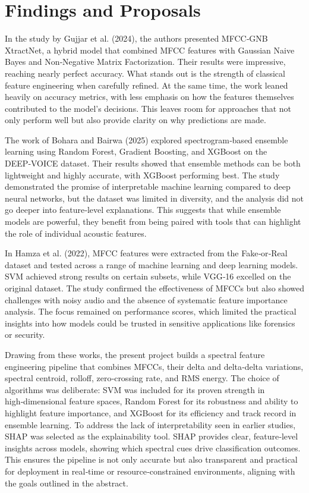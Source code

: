 \documentclass[12pt,a4paper]{report}
\begin{document}
\section{Findings and Proposals}

In the study by Gujjar et al. (2024), the authors presented MFCC‑GNB XtractNet, a hybrid model that combined MFCC features with Gaussian Naive Bayes and Non‑Negative Matrix Factorization. Their results were impressive, reaching nearly perfect accuracy. What stands out is the strength of classical feature engineering when carefully refined. At the same time, the work leaned heavily on accuracy metrics, with less emphasis on how the features themselves contributed to the model’s decisions. This leaves room for approaches that not only perform well but also provide clarity on why predictions are made.

The work of Bohara and Bairwa (2025) explored spectrogram‑based ensemble learning using Random Forest, Gradient Boosting, and XGBoost on the DEEP‑VOICE dataset. Their results showed that ensemble methods can be both lightweight and highly accurate, with XGBoost performing best. The study demonstrated the promise of interpretable machine learning compared to deep neural networks, but the dataset was limited in diversity, and the analysis did not go deeper into feature‑level explanations. This suggests that while ensemble models are powerful, they benefit from being paired with tools that can highlight the role of individual acoustic features.

In Hamza et al. (2022), MFCC features were extracted from the Fake‑or‑Real dataset and tested across a range of machine learning and deep learning models. SVM achieved strong results on certain subsets, while VGG‑16 excelled on the original dataset. The study confirmed the effectiveness of MFCCs but also showed challenges with noisy audio and the absence of systematic feature importance analysis. The focus remained on performance scores, which limited the practical insights into how models could be trusted in sensitive applications like forensics or security.

Drawing from these works, the present project builds a spectral feature engineering pipeline that combines MFCCs, their delta and delta‑delta variations, spectral centroid, rolloff, zero‑crossing rate, and RMS energy. The choice of algorithms was deliberate: SVM was included for its proven strength in high‑dimensional feature spaces, Random Forest for its robustness and ability to highlight feature importance, and XGBoost for its efficiency and track record in ensemble learning. To address the lack of interpretability seen in earlier studies, SHAP was selected as the explainability tool. SHAP provides clear, feature‑level insights across models, showing which spectral cues drive classification outcomes. This ensures the pipeline is not only accurate but also transparent and practical for deployment in real‑time or resource‑constrained environments, aligning with the goals outlined in the abstract.
\end{document}
